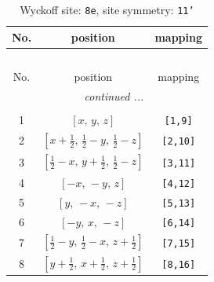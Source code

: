 \documentclass[fleqn,8pt]{jsarticle}
\begin{document}
\renewcommand{\arraystretch}{1.2}
\begin{longtable}{ccc}
\caption{Wyckoff site: {\tt 8e}, site symmetry: {\tt 11'}}
 \\
 \hline \hline
No. & position & mapping \\ \hline \endfirsthead

\multicolumn{2}{l}{\tablename\ \thetable{}} \\
 \hline \hline
No. & position & mapping \\ \hline \endhead

 \hline \hline
\multicolumn{2}{r}{\footnotesize\it continued ...} \\ \endfoot

 \hline \hline
\multicolumn{2}{r}{} \\ \endlastfoot

1 & $\left[ x,\, y,\, z \right]$ & {\tt [1,9]} \\ \hline
2 & $\left[ x + \frac{1}{2},\, \frac{1}{2} - y,\, \frac{1}{2} - z \right]$ & {\tt [2,10]} \\ \hline
3 & $\left[ \frac{1}{2} - x,\, y + \frac{1}{2},\, \frac{1}{2} - z \right]$ & {\tt [3,11]} \\ \hline
4 & $\left[ - x,\, - y,\, z \right]$ & {\tt [4,12]} \\ \hline
5 & $\left[ y,\, - x,\, - z \right]$ & {\tt [5,13]} \\ \hline
6 & $\left[ - y,\, x,\, - z \right]$ & {\tt [6,14]} \\ \hline
7 & $\left[ \frac{1}{2} - y,\, \frac{1}{2} - x,\, z + \frac{1}{2} \right]$ & {\tt [7,15]} \\ \hline
8 & $\left[ y + \frac{1}{2},\, x + \frac{1}{2},\, z + \frac{1}{2} \right]$ & {\tt [8,16]} \\
\end{longtable}
\end{document}
